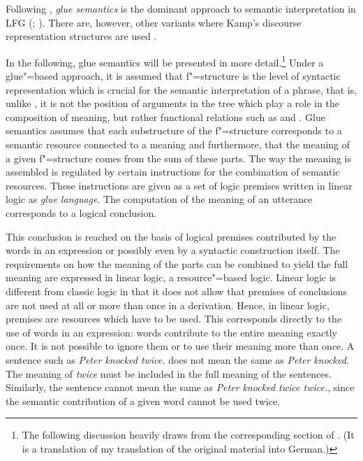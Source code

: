 Following \citet[--92]{Dalrymple2006a}, \emph{glue semantics} is the dominant approach to semantic interpretation in LFG
(\citealp*{DLS93a-u}; \citealp[Chapter~8]{Dalrymple2001a-u}). There are, however, other variants
where Kamp's discourse representation structures \citep{KR93a} are used \citep{FR83b,FR83a}.

In the following, glue semantics will be presented in more detail.\footnote{
The following discussion heavily draws from the corresponding section of . (It
is a translation of my translation of the original material into German.)
}
Under a glue"=based approach, it is assumed that f"=structure is the level of syntactic representation which is crucial for the semantic interpretation of
a phrase, that is, unlike \gbt, it is not the position of arguments in the tree which play a role in the composition of meaning, but rather functional relations such as 
\subj and \obj. Glue semantics assumes that each substructure of the f"=structure corresponds to a semantic resource connected to a meaning and furthermore, that the meaning
of a given f"=structure comes from the sum of these parts. The way the meaning is assembled is
regulated by certain instructions for the combination of semantic resources. These instructions are given
as a set of logic premises written in linear logic as \emph{glue language}. The computation of the meaning of an utterance corresponds to a logical conclusion.

This conclusion is reached on the basis of logical premises contributed by the words in an
expression or possibly even by a syntactic construction itself. The requirements on how the meaning
of the parts can be combined to yield the full meaning are expressed in linear logic, a
resource"=based logic. Linear logic is different from classic logic in that it does not allow that
premises of conclusions are not used at all or more than once in a derivation. Hence, in linear logic, premises
are resources which have to be used. This corresponds directly to the use of words in an expression:
words contribute to the entire meaning exactly once. It is not possible to ignore them or to use
their meaning more than once. A sentence such as \emph{Peter knocked twice.} does not mean the same as \emph{Peter knocked}. The meaning of
\emph{twice} must be included in the full meaning of the sentences. Similarly, the sentence cannot
mean the same as \emph{Peter knocked twice twice.}, since the semantic contribution of a given word cannot be used twice.

